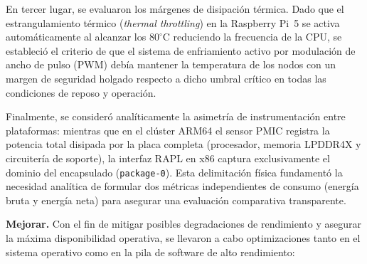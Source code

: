 \documentclass[12pt,oneside,spanish]{book}
\begin{document}
    En tercer lugar, se evaluaron los márgenes de disipación térmica. Dado que el estrangulamiento térmico (\textit{thermal throttling}) en la Raspberry Pi~5 se activa automáticamente al alcanzar los $80^\circ$C reduciendo la frecuencia de la CPU, se estableció el criterio de que el sistema de enfriamiento activo por modulación de ancho de pulso (PWM) debía mantener la temperatura de los nodos con un margen de seguridad holgado respecto a dicho umbral crítico en todas las condiciones de reposo y operación.

Finalmente, se consideró analíticamente la asimetría de instrumentación entre plataformas: mientras que en el clúster ARM64 el sensor PMIC registra la potencia total disipada por la placa completa (procesador, memoria LPDDR4X y circuitería de soporte), la interfaz RAPL en x86 captura exclusivamente el dominio del encapsulado (\texttt{package-0}). Esta delimitación física fundamentó la necesidad analítica de formular dos métricas independientes de consumo (energía bruta y energía neta) para asegurar una evaluación comparativa transparente.

    
    
    \textbf{Mejorar.} Con el fin de mitigar posibles degradaciones de rendimiento y asegurar la máxima disponibilidad operativa, se llevaron a cabo optimizaciones tanto en el sistema operativo como en la pila de software de alto rendimiento:
    \newpage
    
\end{document}
